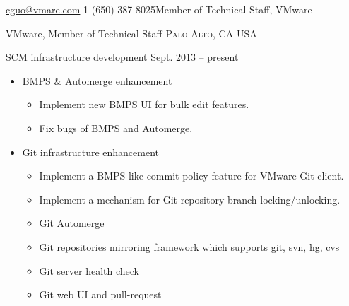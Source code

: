 \documentclass[10pt,letterpaper]{article}
\begin{document}
 



\noindent\href{mailto:cguo@vmware.com}{cguo@vmare.com}\bull
\textsmaller{+}1 (650) 387-8025\bull Member of Technical Staff, VMware

\spacedhrule{0.9em}{-0.4em} %



\headedsection
{VMware, Member of Technical Staff}
{\textsc{Palo Alto, CA USA}} {
\headedsubsection 
{SCM infrastructure development} {Sept. 2013 -- present}
{
    \begin{itemize}
        \item \href{http://bmps.eng.vmware.com}{BMPS} \& Automerge enhancement
            \begin{itemize}
                \item Implement new BMPS UI for bulk edit features.
                \item Fix bugs of BMPS and Automerge.
            \end{itemize}
        \item Git infrastructure enhancement
            \begin{itemize}
                \item Implement a BMPS-like commit policy feature for VMware Git client.
                \item Implement a mechanism for Git repository branch locking/unlocking.
                \item Git Automerge
                \item Git repositories mirroring framework which supports git,
                    svn, hg, cvs
                \item Git server health check
                \item Git web UI and pull-request
            \end{itemize}

    \end{itemize}
}
}
\end{document}
